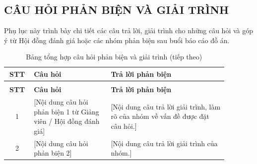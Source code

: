 \clearpage
\pagestyle{appendixlandscape}
\markboth{}{}

\begin{landscape}
\chapter{CÂU HỎI PHẢN BIỆN VÀ GIẢI TRÌNH}

Phụ lục này trình bày chi tiết các câu trả lời, giải trình cho những câu hỏi và góp ý từ Hội đồng đánh giá hoặc các nhóm phản biện sau buổi báo cáo đồ án. 

\renewcommand{\arraystretch}{1.5}
\begin{longtable}{@{} c p{0.35\linewidth} p{0.53\linewidth} @{}}
\caption{Bảng tổng hợp câu hỏi phản biện và giải trình} \\
\toprule
\textbf{STT} & \textbf{Câu hỏi} & \textbf{Trả lời phản biện}  \\
\midrule
\endfirsthead

\caption[]{Bảng tổng hợp câu hỏi phản biện và giải trình (tiếp theo)} \\
\toprule
\textbf{STT} & \textbf{Câu hỏi} & \textbf{Trả lời phản biện} \\
\midrule
\endhead

\bottomrule
\endfoot

\bottomrule
\endlastfoot

    1 & [Nội dung câu hỏi phản biện 1 từ Giảng viên / Hội đồng đánh giá]
    & [Nội dung câu trả lời giải trình, làm rõ của nhóm về vấn đề được đặt câu hỏi.]\\
    \midrule
    2 & [Nội dung câu hỏi phản biện 2]
    & [Nội dung câu trả lời giải trình của nhóm.]\\

\end{longtable}
\end{landscape}

\clearpage
\pagestyle{customfancy}   %